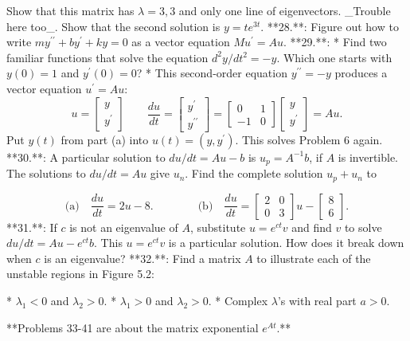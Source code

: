 Show that this matrix has \(\lambda=3,3\) and only one line of eigenvectors. _Trouble here too_. Show that the second solution is \(y=te^{3t}\).
**28.**: Figure out how to write \(my^{\prime\prime}+by^{\prime}+ky=0\) as a vector equation \(Mu^{\prime}=Au\).
**29.**:
* Find two familiar functions that solve the equation \(d^{2}y/dt^{2}=-y\). Which one starts with \(y(0)=1\) and \(y^{\prime}(0)=0\)?
* This second-order equation \(y^{\prime\prime}=-y\) produces a vector equation \(u^{\prime}=Au\): \[u=\begin{bmatrix}y\\ y^{\prime}\end{bmatrix}\qquad\frac{du}{dt}=\begin{bmatrix}y^{\prime}\\ y^{\prime\prime}\end{bmatrix}=\begin{bmatrix}0&1\\ -1&0\end{bmatrix}\begin{bmatrix}y\\ y^{\prime}\end{bmatrix}=Au.\] Put \(y(t)\) from part (a) into \(u(t)=(y,y^{\prime})\). This solves Problem 6 again.
**30.**: A particular solution to \(du/dt=Au-b\) is \(u_{p}=A^{-1}b\), if \(A\) is invertible. The solutions to \(du/dt=Au\) give \(u_{n}\). Find the complete solution \(u_{p}+u_{n}\) to

\[\text{(a)}\quad\frac{du}{dt}=2u-8.\qquad\qquad\text{(b)}\quad\frac{du}{dt}= \begin{bmatrix}2&0\\ 0&3\end{bmatrix}u-\begin{bmatrix}8\\ 6\end{bmatrix}.\]
**31.**: If \(c\) is not an eigenvalue of \(A\), substitute \(u=e^{ct}v\) and find \(v\) to solve \(du/dt=Au-e^{ct}b\). This \(u=e^{ct}v\) is a particular solution. How does it break down when \(c\) is an eigenvalue?
**32.**: Find a matrix \(A\) to illustrate each of the unstable regions in Figure 5.2:

* \(\lambda_{1}<0\) and \(\lambda_{2}>0\).
* \(\lambda_{1}>0\) and \(\lambda_{2}>0\).
* Complex \(\lambda\)'s with real part \(a>0\).

**Problems 33-41 are about the matrix exponential \(e^{At}\).**